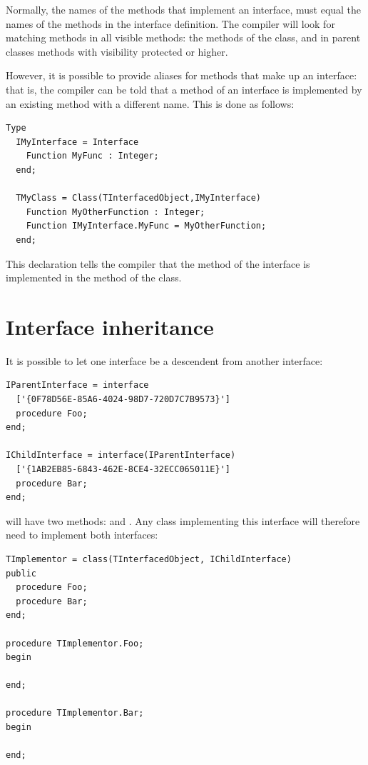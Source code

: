Normally, the names of the methods that implement an interface, must
equal the names of the methods in the interface definition. The compiler
will look for matching methods in all visible methods: the methods of the
class, and in parent classes methods with visibility protected or higher.

However, it is possible to provide aliases for methods that make up an
interface: that is, the compiler can be told that a method of an interface
is implemented by an existing method with a different name.
This is done as follows:
\begin{verbatim}
Type
  IMyInterface = Interface
    Function MyFunc : Integer;
  end;

  TMyClass = Class(TInterfacedObject,IMyInterface)
    Function MyOtherFunction : Integer;
    Function IMyInterface.MyFunc = MyOtherFunction;
  end;
\end{verbatim}
This declaration tells the compiler that the  method of
the  interface is implemented in the 
method of the  class.

\section{Interface inheritance}
It is possible to let one interface be a descendent from another interface:
\begin{verbatim}
IParentInterface = interface
  ['{0F78D56E-85A6-4024-98D7-720D7C7B9573}']
  procedure Foo;
end;

IChildInterface = interface(IParentInterface)
  ['{1AB2EB85-6843-462E-8CE4-32ECC065011E}']
  procedure Bar;
end;
\end{verbatim}
 will have two methods:  and .
Any class implementing this interface will therefore need to implement both interfaces:
\begin{verbatim}
TImplementor = class(TInterfacedObject, IChildInterface)
public
  procedure Foo;
  procedure Bar;
end;

procedure TImplementor.Foo;
begin

end;

procedure TImplementor.Bar;
begin

end;
\end{verbatim}

